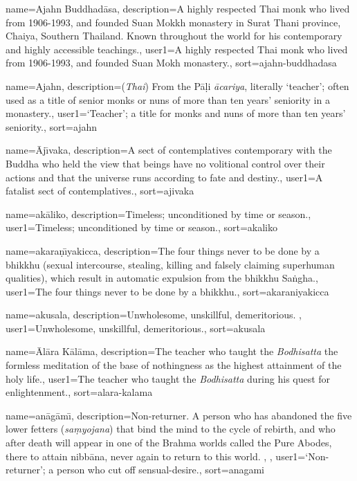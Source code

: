 {
name={Ajahn Buddhad\=asa},
description={A highly respected Thai monk who lived from 1906-1993, and founded Suan Mokkh monastery in Surat Thani province, Chaiya, Southern Thailand. Known throughout the world for his contemporary and highly accessible teachings.},
user1={A highly respected Thai monk who lived from 1906-1993, and founded Suan Mokh monastery.},
sort={ajahn-buddhadasa}
}

{
name=Ajahn,
description={(\textit{Thai}) From the P\=a\d{l}i \textit{\=acariya}, literally `teacher'; often used as a title of senior monks or nuns of more than ten years' seniority in a monastery.},
user1={`Teacher'; a title for monks and nuns of more than ten years' seniority.},
sort={ajahn}
}

{
name={\=Aj\={\i}vaka},
description={A sect of contemplatives contemporary with the Buddha who held the view that beings have no volitional control over their actions and that the universe runs according to fate and destiny.},
user1={A fatalist sect of contemplatives.},
sort={ajivaka}
}

{
name={ak\=aliko},
description={Timeless; unconditioned by time or season.},
user1={Timeless; unconditioned by time or season.},
sort={akaliko}
}

{
name=akara\d{n}\={\i}yakicca,
description={The four things never to be done by a bhikkhu (sexual intercourse, stealing, killing and falsely claiming superhuman qualities), which result in automatic expulsion from the bhikkhu Sa\.ngha.},
user1={The four things never to be done by a bhikkhu.},
sort={akaraniyakicca}
}

{
name=akusala,
description={Unwholesome, unskillful, demeritorious. \protect \seepre %
\protect {}%
\protect \seepost %
},
user1={Unwholesome, unskillful, demeritorious.},
sort={akusala}
}

{
name={\=Al\=ara K\=al\=ama},
description={The teacher who taught the \textit{Bodhisatta} the formless meditation of the base of nothingness as the highest attainment of the holy life.},
user1={The teacher who taught the \textit{Bodhisatta} during his quest for enlightenment.},
sort={alara-kalama}
}

{
name={an\=ag\=am\={\i}},
description={Non-returner. A person who has abandoned the five lower fetters (\textit{sa\d{m}yojana}) that bind the mind to the cycle of rebirth, and who after death will appear in one of the Brahma worlds called the Pure Abodes, there to attain nibb\=ana, never again to return to this world. \protect \seepre %
\protect {}, \protect {}%
\protect \seepost %
},
user1={`Non-returner'; a person who cut off sensual-desire.},
sort={anagami}
}

